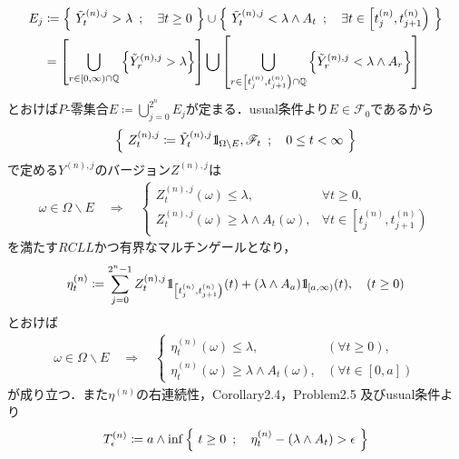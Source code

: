 \begin{prf}
\begin{description}
\begin{align}
					E_j &\coloneqq \left\{\ \tilde{Y}^{(n),j}_t > \lambda\ \, ; \quad \exists t \geq 0\ \right\} 
						\cup \left\{\ \tilde{Y}^{(n),j}_t < \lambda \wedge A_t\ \, ; \quad \exists t \in \left[t^{(n)}_j, t^{(n)}_{j+1} \right)\ \right\} \\
					&= \left[ \bigcup_{r \in [0,\infty)\cap\mathbb{Q}}\left\{\tilde{Y}^{(n),j}_r > \lambda\right\} \right]
					\bigcup \left[ \bigcup_{r \in \left[t^{(n)}_j, t^{(n)}_{j+1} \right)\cap\mathbb{Q}}\left\{\tilde{Y}^{(n),j}_r < \lambda \wedge A_r\right\} \right]
				\end{align}
				とおけば$P$-零集合$E \coloneqq \bigcup_{j=0}^{2^n} E_j$が定まる．usual条件より$E \in \mathscr{F}_0$であるから
				\begin{align}
					\left\{\ Z^{(n),j}_t \coloneqq \tilde{Y}^{(n),j}_t \mbox{1}\hspace{-0.25em}\mbox{l}_{\Omega \backslash E},
					\mathscr{F}_t\ \, ; \quad 0 \leq t < \infty\ \right\}
				\end{align}
				で定める$Y^{(n),j}$のバージョン$Z^{(n),j}$は
				\begin{align}
					\omega \in \Omega \backslash E
					\quad \Longrightarrow \quad
					\begin{cases}
						Z^{(n),j}_t(\omega) \leq \lambda, & \forall t \geq 0, \\
						Z^{(n),j}_t(\omega) \geq \lambda \wedge A_t(\omega), & \forall t \in \left[t^{(n)}_j, t^{(n)}_{j+1} \right)
					\end{cases}
				\end{align}
				を満たす$RCLL$かつ有界なマルチンゲールとなり，
				\begin{align}
					\eta^{(n)}_t \coloneqq
					\sum_{j=0}^{2^n-1} Z^{(n),j}_t \mbox{1}\hspace{-0.25em}\mbox{l}_{\left[t^{(n)}_j,t^{(n)}_{j+1}\right)}(t)
						+ (\lambda \wedge A_a) \mbox{1}\hspace{-0.25em}\mbox{l}_{[a,\infty)}(t),
					\quad (t \geq 0)
				\end{align}
				とおけば
				\begin{align}
					\omega \in \Omega \backslash E
					\quad \Longrightarrow \quad
					\begin{cases}
						\eta^{(n)}_t(\omega) \leq \lambda, & (\forall t \geq 0), \\
						\eta^{(n)}_t(\omega) \geq \lambda \wedge A_t(\omega), & (\forall t \in [0,a])
					\end{cases}
					\label{eq:chapter_1_theorem_4_14_4}
				\end{align}
				が成り立つ．また$\eta^{(n)}$の右連続性，Corollary2.4，Problem2.5 及びusual条件より
				\begin{align}
					T^{(n)}_\epsilon \coloneqq
					a \wedge \inf{}{\Set{t \geq 0}{\eta^{(n)}_t - (\lambda \wedge A_t)  > \epsilon}}

\end{align}
\end{description}
\end{prf}
